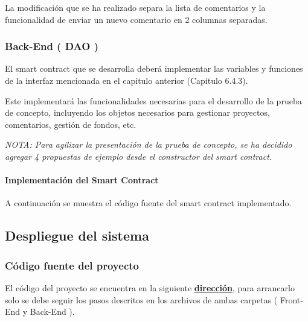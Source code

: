 \bigskip

La modificación que se ha realizado separa la lista de comentarios y la funcionalidad de enviar un nuevo comentario en 2 columnas separadas.

\newpage

\subsubsection{Back-End  ( DAO ) }
El smart contract que se desarrolla deberá implementar las variables y funciones de la interfaz mencionada en el capitulo anterior (Capitulo 6.4.3).

\bigskip

Este implementará las funcionalidades necesarias para el desarrollo de la prueba de concepto, incluyendo los objetos necesarios para gestionar proyectos, comentarios, gestión de fondos, etc.

\bigskip

\textit{NOTA: Para agilizar la presentación de la prueba de concepto, se ha decidido agregar 4 propuestas de ejemplo desde el constructor del smart contract.}

\bigskip

\paragraph{Implementación del Smart Contract}

A continuación se muestra el código fuente del smart contract implementado.

\bigskip



\newpage

\subsection{Despliegue del sistema}

\subsubsection{Código fuente del proyecto}

El código del proyecto se encuentra en la siguiente \textcolor{blue}{\href{https://github.com/Frenzoid/UA_TFG}{\textbf{dirección}}}, para arrancarlo solo se debe seguir los pasos descritos en los archivos  de ambas carpetas ( Front-End y Back-End ).


